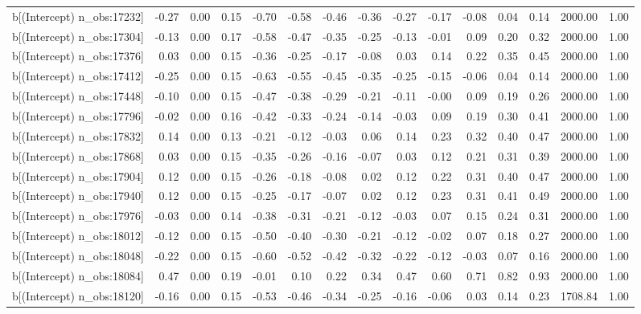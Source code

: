 \begin{table}[ht]
\begin{tabular}{rrrrrrrrrrrrrrr}
  b[(Intercept) n\_obs:17232] & -0.27 & 0.00 & 0.15 & -0.70 & -0.58 & -0.46 & -0.36 & -0.27 & -0.17 & -0.08 & 0.04 & 0.14 & 2000.00 & 1.00 \\ 
  b[(Intercept) n\_obs:17304] & -0.13 & 0.00 & 0.17 & -0.58 & -0.47 & -0.35 & -0.25 & -0.13 & -0.01 & 0.09 & 0.20 & 0.32 & 2000.00 & 1.00 \\ 
  b[(Intercept) n\_obs:17376] & 0.03 & 0.00 & 0.15 & -0.36 & -0.25 & -0.17 & -0.08 & 0.03 & 0.14 & 0.22 & 0.35 & 0.45 & 2000.00 & 1.00 \\ 
  b[(Intercept) n\_obs:17412] & -0.25 & 0.00 & 0.15 & -0.63 & -0.55 & -0.45 & -0.35 & -0.25 & -0.15 & -0.06 & 0.04 & 0.14 & 2000.00 & 1.00 \\ 
  b[(Intercept) n\_obs:17448] & -0.10 & 0.00 & 0.15 & -0.47 & -0.38 & -0.29 & -0.21 & -0.11 & -0.00 & 0.09 & 0.19 & 0.26 & 2000.00 & 1.00 \\ 
  b[(Intercept) n\_obs:17796] & -0.02 & 0.00 & 0.16 & -0.42 & -0.33 & -0.24 & -0.14 & -0.03 & 0.09 & 0.19 & 0.30 & 0.41 & 2000.00 & 1.00 \\ 
  b[(Intercept) n\_obs:17832] & 0.14 & 0.00 & 0.13 & -0.21 & -0.12 & -0.03 & 0.06 & 0.14 & 0.23 & 0.32 & 0.40 & 0.47 & 2000.00 & 1.00 \\ 
  b[(Intercept) n\_obs:17868] & 0.03 & 0.00 & 0.15 & -0.35 & -0.26 & -0.16 & -0.07 & 0.03 & 0.12 & 0.21 & 0.31 & 0.39 & 2000.00 & 1.00 \\ 
  b[(Intercept) n\_obs:17904] & 0.12 & 0.00 & 0.15 & -0.26 & -0.18 & -0.08 & 0.02 & 0.12 & 0.22 & 0.31 & 0.40 & 0.47 & 2000.00 & 1.00 \\ 
  b[(Intercept) n\_obs:17940] & 0.12 & 0.00 & 0.15 & -0.25 & -0.17 & -0.07 & 0.02 & 0.12 & 0.23 & 0.31 & 0.41 & 0.49 & 2000.00 & 1.00 \\ 
  b[(Intercept) n\_obs:17976] & -0.03 & 0.00 & 0.14 & -0.38 & -0.31 & -0.21 & -0.12 & -0.03 & 0.07 & 0.15 & 0.24 & 0.31 & 2000.00 & 1.00 \\ 
  b[(Intercept) n\_obs:18012] & -0.12 & 0.00 & 0.15 & -0.50 & -0.40 & -0.30 & -0.21 & -0.12 & -0.02 & 0.07 & 0.18 & 0.27 & 2000.00 & 1.00 \\ 
  b[(Intercept) n\_obs:18048] & -0.22 & 0.00 & 0.15 & -0.60 & -0.52 & -0.42 & -0.32 & -0.22 & -0.12 & -0.03 & 0.07 & 0.16 & 2000.00 & 1.00 \\ 
  b[(Intercept) n\_obs:18084] & 0.47 & 0.00 & 0.19 & -0.01 & 0.10 & 0.22 & 0.34 & 0.47 & 0.60 & 0.71 & 0.82 & 0.93 & 2000.00 & 1.00 \\ 
  b[(Intercept) n\_obs:18120] & -0.16 & 0.00 & 0.15 & -0.53 & -0.46 & -0.34 & -0.25 & -0.16 & -0.06 & 0.03 & 0.14 & 0.23 & 1708.84 & 1.00 \\ 

\end{tabular}
\end{table}
